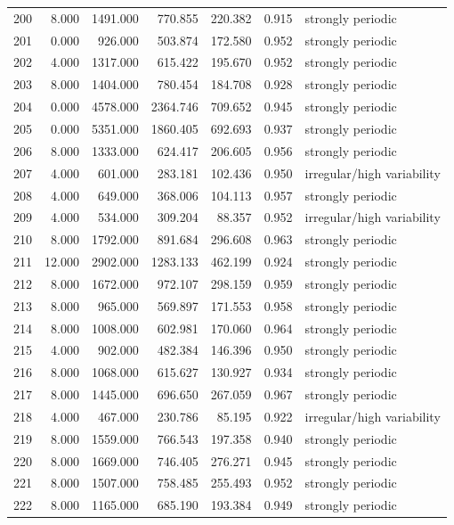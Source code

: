 \begin{longtable}{lrrrrrl}
200 & 8.000 & 1491.000 & 770.855 & 220.382 & 0.915 & strongly periodic \\
201 & 0.000 & 926.000 & 503.874 & 172.580 & 0.952 & strongly periodic \\
202 & 4.000 & 1317.000 & 615.422 & 195.670 & 0.952 & strongly periodic \\
203 & 8.000 & 1404.000 & 780.454 & 184.708 & 0.928 & strongly periodic \\
204 & 0.000 & 4578.000 & 2364.746 & 709.652 & 0.945 & strongly periodic \\
205 & 0.000 & 5351.000 & 1860.405 & 692.693 & 0.937 & strongly periodic \\
206 & 8.000 & 1333.000 & 624.417 & 206.605 & 0.956 & strongly periodic \\
207 & 4.000 & 601.000 & 283.181 & 102.436 & 0.950 & irregular/high variability \\
208 & 4.000 & 649.000 & 368.006 & 104.113 & 0.957 & strongly periodic \\
209 & 4.000 & 534.000 & 309.204 & 88.357 & 0.952 & irregular/high variability \\
210 & 8.000 & 1792.000 & 891.684 & 296.608 & 0.963 & strongly periodic \\
211 & 12.000 & 2902.000 & 1283.133 & 462.199 & 0.924 & strongly periodic \\
212 & 8.000 & 1672.000 & 972.107 & 298.159 & 0.959 & strongly periodic \\
213 & 8.000 & 965.000 & 569.897 & 171.553 & 0.958 & strongly periodic \\
214 & 8.000 & 1008.000 & 602.981 & 170.060 & 0.964 & strongly periodic \\
215 & 4.000 & 902.000 & 482.384 & 146.396 & 0.950 & strongly periodic \\
216 & 8.000 & 1068.000 & 615.627 & 130.927 & 0.934 & strongly periodic \\
217 & 8.000 & 1445.000 & 696.650 & 267.059 & 0.967 & strongly periodic \\
218 & 4.000 & 467.000 & 230.786 & 85.195 & 0.922 & irregular/high variability \\
219 & 8.000 & 1559.000 & 766.543 & 197.358 & 0.940 & strongly periodic \\
220 & 8.000 & 1669.000 & 746.405 & 276.271 & 0.945 & strongly periodic \\
221 & 8.000 & 1507.000 & 758.485 & 255.493 & 0.952 & strongly periodic \\
222 & 8.000 & 1165.000 & 685.190 & 193.384 & 0.949 & strongly periodic \\

\end{longtable}
